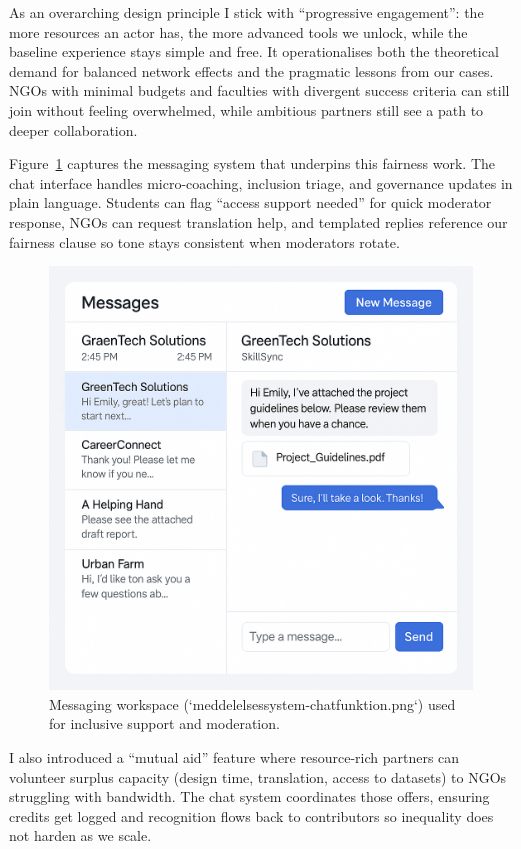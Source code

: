 As an overarching design principle I stick with ``progressive engagement'': the more resources an actor has, the more advanced tools we unlock, while the baseline experience stays simple and free. It operationalises both the theoretical demand for balanced network effects and the pragmatic lessons from our cases. NGOs with minimal budgets and faculties with divergent success criteria can still join without feeling overwhelmed, while ambitious partners still see a path to deeper collaboration.

Figure~\ref{fig:chat-system} captures the messaging system that underpins this fairness work. The chat interface handles micro-coaching, inclusion triage, and governance updates in plain language. Students can flag ``access support needed'' for quick moderator response, NGOs can request translation help, and templated replies reference our fairness clause so tone stays consistent when moderators rotate.

\begin{figure}[h]
  \centering
  \includegraphics[width=0.85\linewidth]{figures/meddelelsessystem-chatfunktion.png}
  \caption{Messaging workspace (`meddelelsessystem-chatfunktion.png`) used for inclusive support and moderation.}
  \label{fig:chat-system}
\end{figure}

I also introduced a ``mutual aid'' feature where resource-rich partners can volunteer surplus capacity (design time, translation, access to datasets) to NGOs struggling with bandwidth. The chat system coordinates those offers, ensuring credits get logged and recognition flows back to contributors so inequality does not harden as we scale.

